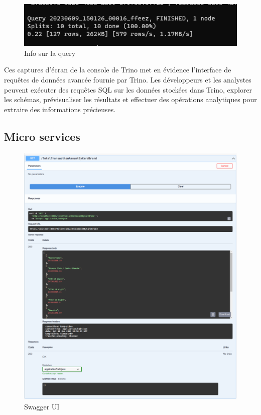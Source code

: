 \begin{figure}[H]
\centering
\includegraphics[width=\linewidth]{images/trino-3.png}
\caption{Info sur la query}\label{fig:trino-3}
\end{figure}

Ces captures d'écran de la console de Trino met en évidence l'interface de requêtes de données avancée fournie par Trino. Les développeurs et les analystes peuvent exécuter des requêtes SQL sur les données stockées dans Trino, explorer les schémas, prévisualiser les résultats et effectuer des opérations analytiques pour extraire des informations précieuses.

\subsection{Micro services}
\begin{figure}[H]
\centering
\includegraphics[width=\linewidth]{images/Swagger-UI-1.png}
\caption{Swagger UI}\label{fig:swagger-1}
\end{figure}

